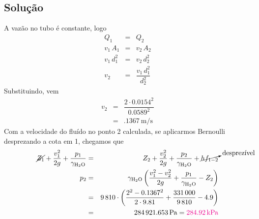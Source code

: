 \documentclass[a4paper, 12pt, brazilian]{article}
\newcommand{\purple}[1]{\textcolor{magenta}{#1}}
\begin{document}
	\subsection{Solução}
	A vazão no tubo é constante, logo
	\begin{eqnarray}
		Q_{1}&=&Q_{2}\\
		v_{1}\,A_{1}&=&v_{2}\,A_{2}\\
		v_{1}\,d_{1}^{2}&=&v_{2}\,d_{2}^{2}\\
		v_{2}&=&\dfrac{v_{1}\,d_{1}^{2}}{d_{2}^{2}}
	\end{eqnarray}
	Substituindo, vem
	\begin{eqnarray}
		v_{2}&=&\dfrac{2\cdot 0.0154^{2}}{0.0589^{2}}\\
			 &=&\SI{.1367}{\meter/\second}
	\end{eqnarray}
	Com a velocidade do fluído no ponto 2 calculada, se aplicarmos Bernoulli des\-prezando a cota em 1, chegamos que
	\begin{eqnarray}
		\cancel{Z_{1}}+\dfrac{v_{1}^{2}}{2g}+\dfrac{p_{1}}{\gamma_{\ce{H2O}}}&=&Z_{2}+\dfrac{v_{2}^{2}}{2g}+\dfrac{p_{2}}{\gamma_{\ce{H2O}}}+\cancelto{\textrm{desprezível}}{hf_{1-2}}\\
		p_{2}&=&\gamma_{\ce{H2O}}\left(\dfrac{v_{1}^{2}-v_{2}^{2}}{2g}+\dfrac{p_{1}}{\gamma_{\ce{H2O}}}-Z_{2}\right)\\
			 &=&9\,810\cdot\left(\dfrac{2^{2}-0.1367^{2}}{2\cdot 9.81}+\dfrac{331\,000}{9\,810}-4.9\right)\\
			 &=&\SI{284921.653}{\pascal}=\purple{\SI{284.92}{\kilo\pascal}}
	\end{eqnarray}
\end{document}
